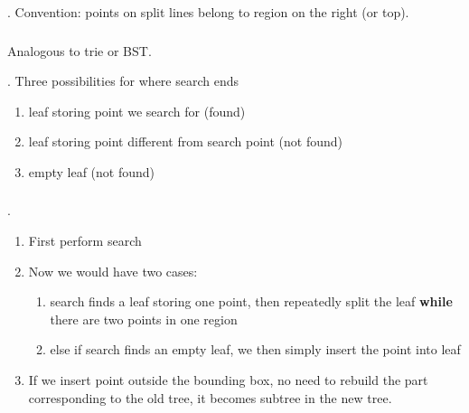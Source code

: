 \documentclass{article}
\begin{document}
\begin{comm}[].
    Convention: points on split lines belong to region on the right (or top).
\end{comm}

\subsubsection{}

Analogous to trie or BST. 

\begin{codes}[].
    Three possibilities for where search ends \begin{enumerate}
        \item leaf storing point we search for (found) 
        \item leaf storing point different from search point (not found) 
        \item empty leaf (not found)
    \end{enumerate}
\end{codes}

\subsubsection{}

\begin{codes}[].
    \begin{enumerate}
        \item First perform search 
        \item Now we would have two cases: \begin{enumerate}
            \item search finds a leaf storing one point, then repeatedly split the leaf \textbf{while} there are two points in one region
            \item else if search finds an empty leaf, we then simply insert the point into leaf
        \end{enumerate}
        \item If we insert point outside the bounding box, no need to rebuild the part corresponding to the old tree, it becomes subtree in the new tree. 
    \end{enumerate}
\end{codes}

\subsubsection{}
\end{document}
